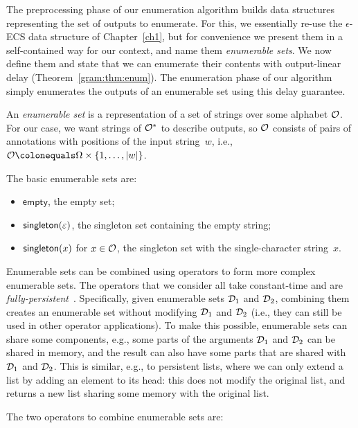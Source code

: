 The preprocessing phase of our enumeration algorithm builds data structures
representing the set of outputs to enumerate. For this, we essentially re-use
the $\epsilon$-ECS data structure of Chapter~\ref{ch1}, but for convenience
we present them in a self-contained way for our context, and
name them \emph{enumerable sets}.
We now define them and state that we can enumerate their contents
with output-linear delay (Theorem~\ref{gram:thm:enum}).
The enumeration phase of our algorithm simply enumerates the outputs of 
an enumerable set using this delay guarantee.

An \emph{enumerable set}  is a representation of a set of
strings over some alphabet $\mathcal{O}$.  For our case, we want strings of
$\mathcal{O}^*$ to describe outputs, so $\mathcal{O}$ consists of pairs of
%
%
annotations
with positions of the input
string~$w$, i.e.,
$\O \colonequals \Omega \times \{1, \ldots, |w|\}$.
%

The basic enumerable sets are:
\begin{itemize}
  \item $\textsf{empty}$, the empty set;
  \item $\textsf{singleton}(\varepsilon)$, the singleton set containing the empty string;
  \item $\textsf{singleton}(x)$ for
$x \in \mathcal{O}$, the singleton set with the
    single-character string~$x$.
\end{itemize}

Enumerable sets can be combined using operators to form more complex
enumerable sets. The operators that we consider all take constant-time
and are {\em
fully-persistent}~\cite{driscoll1986making}. Specifically, given
enumerable sets $\mathcal{D}_1$ and $\mathcal{D}_2$, combining them creates an
enumerable set without modifying $\mathcal{D}_1$ and $\mathcal{D}_2$ (i.e., they can still be
used in other operator applications). To make this
possible, enumerable sets can share some components, e.g., some parts
of the arguments $\mathcal{D}_1$ and $\mathcal{D}_2$ can be shared in memory, and
the result can also have some parts that are shared with
$\mathcal{D}_1$ and $\mathcal{D}_2$. This is similar, e.g., to persistent lists,
where we can only extend a list by adding an element to its head: this
does not modify the original list, and returns a new
list sharing some memory with the original list.
%
%
%

The two operators to combine enumerable sets are:

